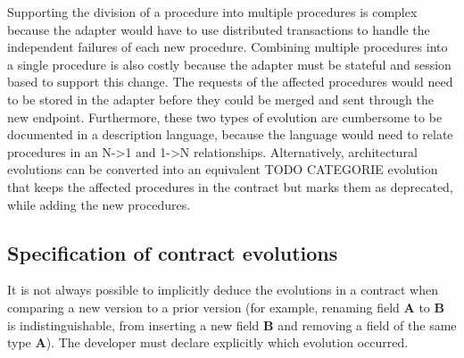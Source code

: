 Supporting the division of a procedure into multiple procedures is complex because the adapter would have to use distributed transactions to handle the independent failures of each new procedure.
Combining multiple procedures into a single procedure is also costly because the adapter must be stateful and session based to support this change.
The requests of the affected procedures would need to be stored in the adapter before they could be merged and sent through the new endpoint.
Furthermore, these two types of evolution are cumbersome to be documented in a description language, because the language would need to relate procedures in an N->1 and 1->N relationships.
Alternatively, architectural evolutions can be converted into an equivalent TODO CATEGORIE evolution that keeps the affected procedures in the contract but marks them as deprecated, while adding the new procedures.

\subsection{Specification of contract evolutions} %
\label{sec:evolution_specification}

It is not always possible to implicitly deduce the evolutions in a contract when comparing a new version to a prior version
(for example, renaming field \textbf{A} to \textbf{B} is indistinguishable, from inserting a new field \textbf{B} and removing a field of the same type \textbf{A}).
The developer must declare explicitly which evolution occurred.

